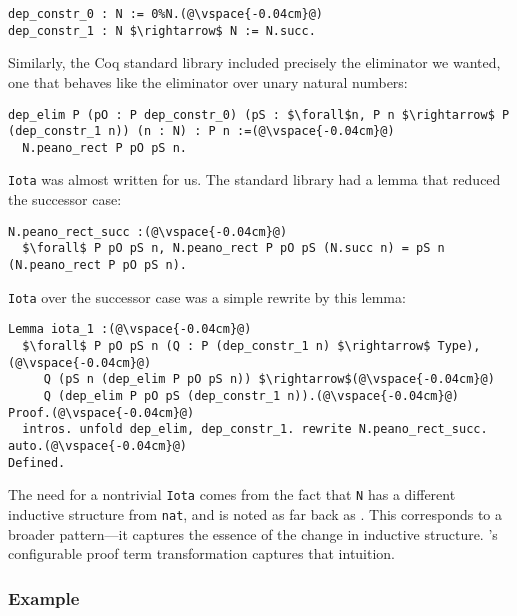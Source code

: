 \begin{lstlisting}
dep_constr_0 : N := 0%N.(@\vspace{-0.04cm}@)
dep_constr_1 : N $\rightarrow$ N := N.succ.
\end{lstlisting}
Similarly, the Coq standard library included precisely the eliminator we wanted, one that behaves
like the eliminator over unary natural numbers:

\begin{lstlisting}
dep_elim P (pO : P dep_constr_0) (pS : $\forall$n, P n $\rightarrow$ P (dep_constr_1 n)) (n : N) : P n :=(@\vspace{-0.04cm}@)
  N.peano_rect P pO pS n.
\end{lstlisting}
\lstinline{Iota} was almost written for us.
The standard library had a lemma that reduced the successor case:

\begin{lstlisting}
N.peano_rect_succ :(@\vspace{-0.04cm}@)
  $\forall$ P pO pS n, N.peano_rect P pO pS (N.succ n) = pS n (N.peano_rect P pO pS n).
\end{lstlisting}
\lstinline{Iota} over the successor case was a simple rewrite by this lemma:

\begin{lstlisting}
Lemma iota_1 :(@\vspace{-0.04cm}@)
  $\forall$ P pO pS n (Q : P (dep_constr_1 n) $\rightarrow$ Type),(@\vspace{-0.04cm}@)
     Q (pS n (dep_elim P pO pS n)) $\rightarrow$(@\vspace{-0.04cm}@)
     Q (dep_elim P pO pS (dep_constr_1 n)).(@\vspace{-0.04cm}@)
Proof.(@\vspace{-0.04cm}@)
  intros. unfold dep_elim, dep_constr_1. rewrite N.peano_rect_succ. auto.(@\vspace{-0.04cm}@)
Defined.
\end{lstlisting}

The need for a nontrivial \lstinline{Iota} comes from the fact that \lstinline{N} has a different
inductive structure from \lstinline{nat}, and is noted as far back as \citet{magaud2000changing}.
This corresponds to a broader pattern---it captures the essence of the change in inductive structure.
\toolname's configurable proof term transformation captures that intuition.

\subsubsection{Example}

